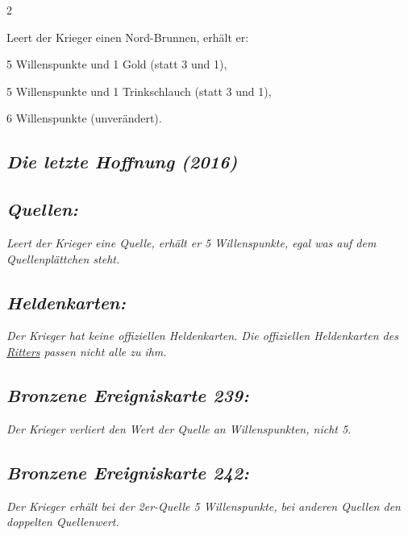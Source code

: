 \documentclass[10pt, a4paper, oneside]{book}
\newcommand{\fan}[1]{\textit{#1}}
\begin{document}
\begin{multicols*}{2}
\begin{bgcolor}
Leert der Krieger einen Nord-Brunnen, erhält er:
\supercite{dridn-begleitheft}

\bullet{} 5 Willenspunkte und 1 Gold (statt 3 und 1),

\bullet{} 5 Willenspunkte und 1 Trinkschlauch (statt 3 und 1),

\bullet{} 6 Willenspunkte (unverändert).

\end{bgcolor}




\columnbreak


\begin{bgcolor}
\section{\fan{Die letzte Hoffnung (2016)}}

\subsection{\fan{Quellen:}}

\fan{Leert der Krieger eine Quelle, erhält er 5 Willenspunkte, egal was auf dem Quellenplättchen steht.}


\subsection{\fan{Heldenkarten:}}

\fan{Der Krieger hat keine offiziellen Heldenkarten. Die offiziellen Heldenkarten des \hyperref[ritter]{Ritters} passen nicht alle zu ihm.}



\subsection{\fan{Bronzene Ereigniskarte 239:}}

\fan{Der Krieger verliert den Wert der Quelle an Willenspunkten, nicht 5.}


\subsection{\fan{Bronzene Ereigniskarte 242:}}

\fan{Der Krieger erhält bei der 2er-Quelle 5 Willenspunkte, bei anderen Quellen den doppelten Quellenwert.}

\end{bgcolor}


\begin{bgcolor}[color-bb]

\end{bgcolor}
\end{multicols*}
\end{document}
